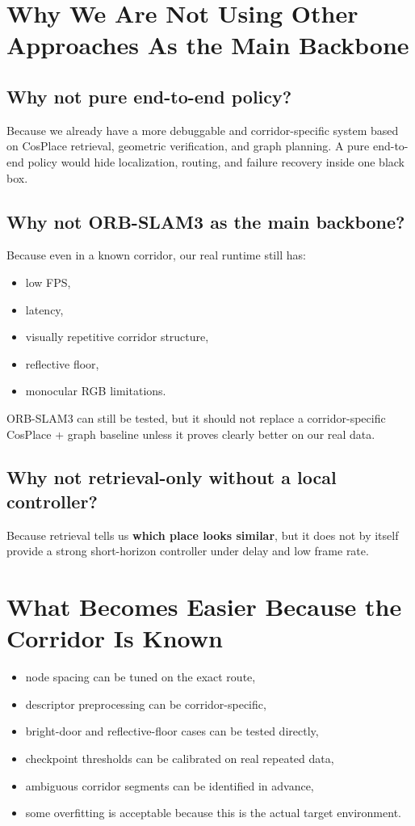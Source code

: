 \documentclass[11pt,a4paper]{article}
\begin{document}
\section{Why We Are Not Using Other Approaches As the Main Backbone}

\subsection*{Why not pure end-to-end policy?}

Because we already have a more debuggable and corridor-specific system based on
CosPlace retrieval, geometric verification, and graph planning. A pure end-to-end
policy would hide localization, routing, and failure recovery inside one black box.

\subsection*{Why not ORB-SLAM3 as the main backbone?}

Because even in a known corridor, our real runtime still has:

\begin{itemize}[nosep]
  \item low FPS,
  \item latency,
  \item visually repetitive corridor structure,
  \item reflective floor,
  \item monocular RGB limitations.
\end{itemize}

ORB-SLAM3 can still be tested, but it should not replace a corridor-specific
CosPlace + graph baseline unless it proves clearly better on our real data.

\subsection*{Why not retrieval-only without a local controller?}

Because retrieval tells us \textbf{which place looks similar}, but it does not
by itself provide a strong short-horizon controller under delay and low frame rate.


\section{What Becomes Easier Because the Corridor Is Known}

\begin{itemize}[nosep]
  \item node spacing can be tuned on the exact route,
  \item descriptor preprocessing can be corridor-specific,
  \item bright-door and reflective-floor cases can be tested directly,
  \item checkpoint thresholds can be calibrated on real repeated data,
  \item ambiguous corridor segments can be identified in advance,
  \item some overfitting is acceptable because this is the actual target environment.
\end{itemize}
\end{document}
